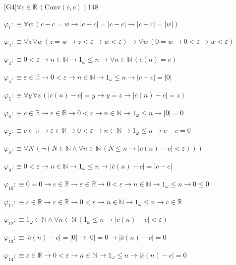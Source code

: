 \begin{fullproof}{[G4]}{$\forall c \in \mathbb{R}\,(\mathrm{Conv}(\overline{c},c))$}{148}
\begin{abbrevlist}
\item $\varphi_{1} :\equiv \forall w\,(c - c = w \to \lvert c - c \rvert = \lvert c - c \rvert \to \lvert c - c \rvert = \lvert w \rvert)$
\item $\varphi_{2} :\equiv \forall z\,\forall w\,(z = w \to z < \varepsilon \to w < \varepsilon) \to \forall w\,(0 = w \to 0 < \varepsilon \to w < \varepsilon)$
\item $\varphi_{3} :\equiv 0 < \varepsilon \to n \in \mathbb{N} \to 1_{\omega} \leq n \to \forall n \in \mathbb{N}\,(\overline{c}(n) = c)$
\item $\varphi_{4} :\equiv \varepsilon \in \mathbb{R} \to 0 < \varepsilon \to n \in \mathbb{N} \to 1_{\omega} \leq n \to \lvert c - c \rvert = \lvert 0 \rvert$
\item $\varphi_{5} :\equiv \forall y\,\forall z\,(\lvert \overline{c}(n) - c \rvert = y \to y = z \to \lvert \overline{c}(n) - c \rvert = z)$
\item $\varphi_{6} :\equiv c \in \mathbb{R} \to \varepsilon \in \mathbb{R} \to 0 < \varepsilon \to n \in \mathbb{N} \to 1_{\omega} \leq n \to \lvert 0 \rvert = 0$
\item $\varphi_{7} :\equiv c \in \mathbb{R} \to \varepsilon \in \mathbb{R} \to 0 < \varepsilon \to n \in \mathbb{N} \to 1_{\omega} \leq n \to c - c = 0$
\item $\varphi_{8} :\equiv \forall N\,(\neg (N \in \mathbb{N} \land \forall n \in \mathbb{N}\,(N \leq n \to \lvert \overline{c}(n) - c \rvert < \varepsilon)))$
\item $\varphi_{9} :\equiv 0 < \varepsilon \to n \in \mathbb{N} \to 1_{\omega} \leq n \to \lvert \overline{c}(n) - c \rvert = \lvert c - c \rvert$
\item $\varphi_{10} :\equiv 0 = 0 \to c \in \mathbb{R} \to \varepsilon \in \mathbb{R} \to 0 < \varepsilon \to n \in \mathbb{N} \to 1_{\omega} \leq n \to 0 \leq 0$
\item $\varphi_{11} :\equiv c \in \mathbb{R} \to \varepsilon \in \mathbb{R} \to 0 < \varepsilon \to n \in \mathbb{N} \to 1_{\omega} \leq n \to c \in \mathbb{R}$
\item $\varphi_{12} :\equiv 1_{\omega} \in \mathbb{N} \land \forall n \in \mathbb{N}\,(1_{\omega} \leq n \to \lvert \overline{c}(n) - c \rvert < \varepsilon)$
\item $\varphi_{13} :\equiv \lvert \overline{c}(n) - c \rvert = \lvert 0 \rvert \to \lvert 0 \rvert = 0 \to \lvert \overline{c}(n) - c \rvert = 0$
\item $\varphi_{14} :\equiv \varepsilon \in \mathbb{R} \to 0 < \varepsilon \to n \in \mathbb{N} \to 1_{\omega} \leq n \to \lvert \overline{c}(n) - c \rvert = 0$

\end{abbrevlist}
\end{fullproof}
